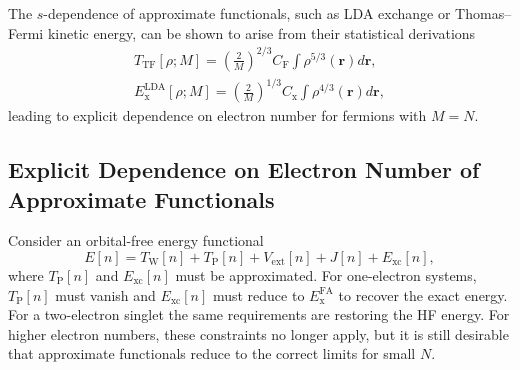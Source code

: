 \documentclass[%
 reprint,
 amsmath,amssymb,
 aps,
pra,
]{revtex4-2}
\begin{document}
The $s$-dependence of approximate functionals, such as LDA exchange or Thomas--Fermi kinetic energy, can be shown to arise from their statistical derivations~\cite{Parr.1989.density, Bosko.2023.PRA.108.052803}
\begin{gather}
    T_{\text{TF}}[\rho; M]
    =
    \left(\frac{2}{M}\right)^{2/3}
    C_{\text{F}}
    \int
    \rho^{5/3}(\mathbf{r})
    d\mathbf{r},\\[10pt]
    E_{\text{x}}^{\text{LDA}}[\rho; M]
    =
    \left(
    \frac{2}{M}
    \right)^{1/3}
    C_{\text{x}}
    \int
    \rho^{4/3}(\mathbf{r})
    d\mathbf{r},
\end{gather}
leading to explicit dependence on electron number for fermions with $M=N$.

\subsection{Explicit Dependence on Electron Number of Approximate Functionals}

Consider an orbital-free energy functional
\begin{equation}
    E[n]
    =
    T_{\text{W}}[n]
    +
    T_{\text{P}}[n]
    +
    V_{\text{ext}}[n]
    +
    J[n]
    +
    E_{\text{xc}}[n],
    \label{eq: OFDFT Energy}
\end{equation}
where $T_{\text{P}}[n]$ and $E_{\text{xc}}[n]$ must be approximated. For one-electron systems, $T_{\text{P}}[n]$ must vanish and $E_{\text{xc}}[n]$ must reduce to $E_{\text{x}}^{\text{FA}}$ to recover the exact energy. For a two-electron singlet the same requirements are restoring the HF energy. For higher electron numbers, these constraints no longer apply, but it is still desirable that approximate functionals reduce to the correct limits for small $N$.
\end{document}
